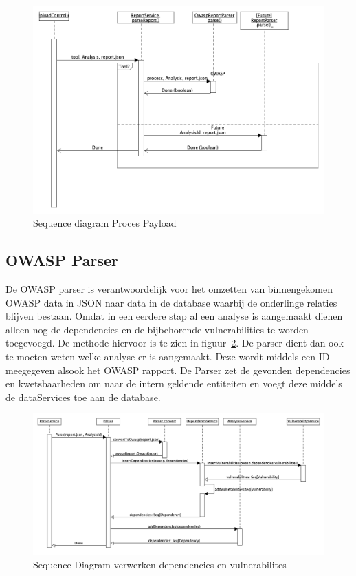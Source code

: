 \begin{figure}[bth]
    \myfloatalign
    \includegraphics[width=12cm]{gfx/umlet/exports/SeqProcessPayload}
    \caption{Sequence diagram Proces Payload}
    \label{fig:ProcesPayload}
\end{figure}

\subsection{OWASP Parser}\label{subsec:owasp-parser}
De OWASP parser is verantwoordelijk voor het omzetten van binnengekomen OWASP data in JSON naar data in de database waarbij de onderlinge relaties blijven bestaan.
Omdat in een eerdere stap al een analyse is aangemaakt dienen alleen nog de dependencies en de bijbehorende vulnerabilities te worden toegevoegd. De methode hiervoor is te zien in figuur~\ref{fig:seqReportParse}.
De parser dient dan ook te moeten weten welke analyse er is aangemaakt. Deze wordt middels een ID meegegeven alsook het OWASP rapport. De Parser zet de gevonden dependencies en kwetsbaarheden om naar de intern geldende entiteiten en voegt deze middels de dataServices toe aan de database.

\begin{figure}[bth]
    \myfloatalign
    \includegraphics[width=12cm]{gfx/umlet/exports/Seq-ParseReport}
    \caption{Sequence Diagram verwerken dependencies en vulnerabilites}
    \label{fig:seqReportParse}
\end{figure}


